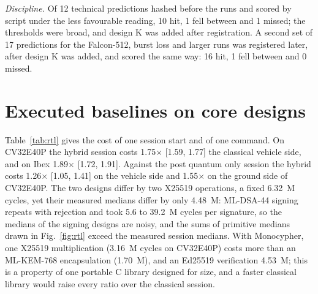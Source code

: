 \documentclass[conference]{IEEEtran}
\begin{document}
\emph{Discipline.} Of 12 technical predictions hashed before the runs and scored by script under the less favourable reading, 10 hit, 1 fell between and 1 missed; the thresholds were broad, and design K was added after registration. A second set of 17 predictions for the Falcon-512, burst loss and larger runs was registered later, after design K was added, and scored the same way: 16 hit, 1 fell between and 0 missed.

\section{Executed baselines on core designs}
\label{sec:rtl}
Table~\ref{tab:rtl} gives the cost of one session start and of one command. On CV32E40P the hybrid session costs 1.75$\times$ [1.59, 1.77] the classical vehicle side, and on Ibex 1.89$\times$ [1.72, 1.91]. Against the post quantum only session the hybrid costs 1.26$\times$ [1.05, 1.41] on the vehicle side and 1.55$\times$ on the ground side of CV32E40P. The two designs differ by two X25519 operations, a fixed 6.32~M cycles, yet their measured medians differ by only 4.48~M: ML-DSA-44 signing repeats with rejection and took 5.6 to 39.2~M cycles per signature, so the medians of the signing designs are noisy, and the sums of primitive medians drawn in Fig.~\ref{fig:rtl} exceed the measured session medians. With Monocypher, one X25519 multiplication (3.16~M cycles on CV32E40P) costs more than an ML-KEM-768 encapsulation (1.70~M), and an Ed25519 verification 4.53~M; this is a property of one portable C library designed for size, and a faster classical library would raise every ratio over the classical session.
\end{document}
